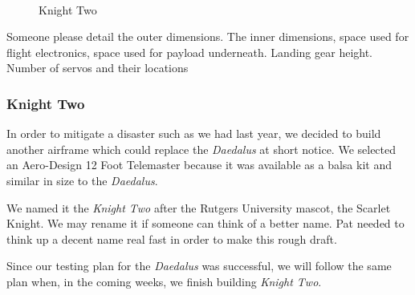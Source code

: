 \documentclass[10pt,twocolumns]{report}
\begin{document}
\begin{figure}
	\centering
\\
  	\label{fig:knighttwo}
  	\caption[Knight Two]{Knight Two}

\end{figure}
Someone please detail the outer dimensions. The inner dimensions, space used for flight electronics, space used for payload underneath. Landing gear height. Number of servos and their locations

\subsubsection{Knight Two}

In order to mitigate a disaster such as we had last year, we decided to build another airframe which could replace the \emph{Daedalus} at short notice. We selected an Aero-Design 12 Foot Telemaster \cite{aerodesign} because it was available as a balsa kit and similar in size to the \emph{Daedalus}.

We named it the \emph{Knight Two} after the Rutgers University mascot, the Scarlet Knight. We may rename it if someone can think of a better name. Pat needed to think up a decent name real fast in order to make this rough draft.

Since our testing plan for the \emph{Daedalus} was successful, we will follow the same plan when, in the coming weeks, we finish building \emph{Knight Two}.
\end{document}
